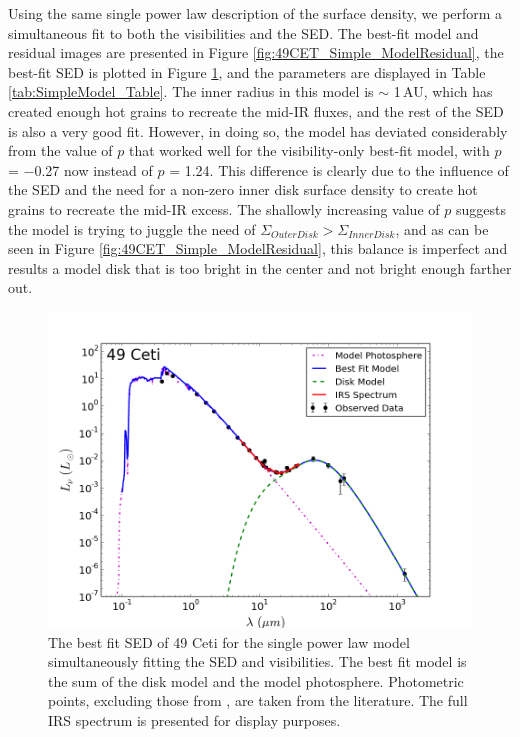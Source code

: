 Using the same single power law description of the surface density, we perform a simultaneous fit to both the visibilities and the SED. The best-fit model and residual images are presented in Figure \ref{fig:49CET_Simple_ModelResidual}, the best-fit SED is plotted in Figure \ref{fig:49CET_Simple_SED}, and the parameters are displayed in Table \ref{tab:SimpleModel_Table}. The inner radius in this model is $\sim$ 1\,AU, which has created enough hot grains to recreate the mid-IR fluxes, and the rest of the SED is also a very good fit. However, in doing so, the model has deviated considerably from the value of $p$ that worked well for the visibility-only best-fit model, with $p$ = $-$0.27 now instead of $p$ = 1.24. This difference is clearly due to the influence of the SED and the need for a non-zero inner disk surface density to create hot grains to recreate the mid-IR excess. The shallowly increasing value of $p$ suggests the model is trying to juggle the need of $\Sigma_{Outer Disk} > \Sigma_{Inner Disk}$, and as can be seen in Figure \ref{fig:49CET_Simple_ModelResidual}, this balance is imperfect and results a model disk that is too bright in the center and not bright enough farther out.


\begin{figure}%
\centering
\includegraphics[width = 1\textwidth]{49CET_Simple_SED.png}
\caption{The best fit SED of 49 Ceti for the single power law model simultaneously fitting the SED and visibilities. The best fit model is the sum of the disk model and the model photosphere. Photometric points, excluding those from \cite{Robe13}, are taken from the literature. The full IRS spectrum is presented for display purposes.}
\label{fig:49CET_Simple_SED}
\end{figure}

